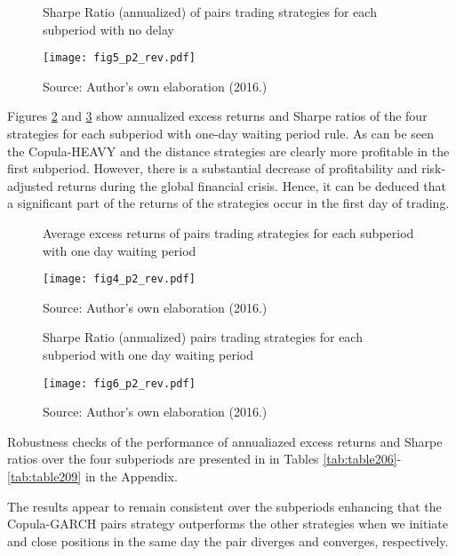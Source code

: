 \documentclass[a4paper,12pt]{report}
\begin{document}
\begin{figure}[H]
	\centering
	\caption{Sharpe Ratio (annualized) of pairs trading strategies for each subperiod with no delay}
	\texttt{[image: fig5\_p2\_rev.pdf]}
	\captionsetup{justification=raggedright,
		singlelinecheck=false
	}
	\caption*{Source: Author's own elaboration (2016.)}
	\label{fig:fig207}
\end{figure}


Figures \ref{fig:fig206} and \ref{fig:fig208} show annualized excess returns and Sharpe ratios of the four strategies for each subperiod with one-day waiting period rule. As can be seen the Copula-HEAVY and the distance strategies are clearly more profitable in the first subperiod. However, there is a substantial decrease of profitability and risk-adjusted returns during the global financial crisis. Hence, it can be deduced that a significant part of the returns of the strategies occur in the first day of trading.

\begin{figure}[H]
	\centering
	\caption{Average excess returns of pairs trading strategies for each subperiod with one day waiting period}
	\texttt{[image: fig4\_p2\_rev.pdf]}
	\captionsetup{justification=raggedright,
		singlelinecheck=false
	}
	\caption*{Source: Author's own elaboration (2016.)}
	\label{fig:fig206}
\end{figure}

\begin{figure}[H]
	\centering
	\caption{Sharpe Ratio (annualized) pairs trading strategies for each subperiod with one day waiting period}
	\texttt{[image: fig6\_p2\_rev.pdf]}
	\captionsetup{justification=raggedright,
		singlelinecheck=false
	}
	\caption*{Source: Author's own elaboration (2016.)}
	\label{fig:fig208}
\end{figure}

\vspace{0.3cm}

Robustness checks of the performance of annualiazed excess returns and Sharpe ratios over the four subperiods are presented in in Tables \ref{tab:table206}-\ref{tab:table209} in the Appendix.

The results appear to remain consistent over the subperiods enhancing that the Copula-GARCH pairs strategy outperforms the other strategies when we initiate and close positions in the same day the pair diverges and converges, respectively.
\end{document}
